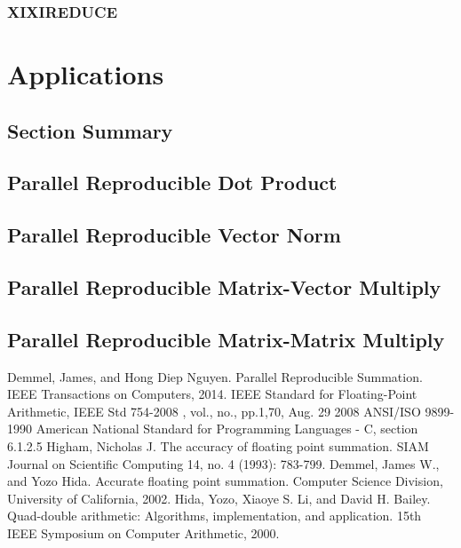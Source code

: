 \documentclass[12pt]{article}
\theoremstyle{definition}
\numberwithin{equation}{section}
\begin{document}
    \subsubsection{XIXIREDUCE}
\section{Applications}
  \subsection{Section Summary}
  \subsection{Parallel Reproducible Dot Product}
  \subsection{Parallel Reproducible Vector Norm}
  \subsection{Parallel Reproducible Matrix-Vector Multiply}
  \subsection{Parallel Reproducible Matrix-Matrix Multiply}
\begin{thebibliography}{9}
    Demmel, James, and Hong Diep Nguyen. Parallel Reproducible Summation. IEEE Transactions on Computers, 2014.
    IEEE Standard for Floating-Point Arithmetic, IEEE Std 754-2008 , vol., no., pp.1,70, Aug. 29 2008
    ANSI/ISO 9899-1990 American National Standard for Programming Languages - C, section 6.1.2.5
    Higham, Nicholas J. The accuracy of floating point summation. SIAM Journal on Scientific Computing 14, no. 4 (1993): 783-799.
    Demmel, James W., and Yozo Hida. Accurate floating point summation. Computer Science Division, University of California, 2002.
    Hida, Yozo, Xiaoye S. Li, and David H. Bailey. Quad-double arithmetic: Algorithms, implementation, and application. 15th IEEE Symposium on Computer Arithmetic, 2000.
\end{thebibliography}
\end{document}
